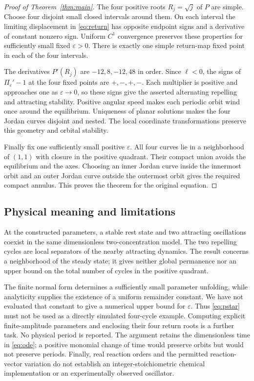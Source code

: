 \documentclass[11pt,a4paper]{article}
\theoremstyle{remark}
\newcommand{\eps}{\varepsilon}
\numberwithin{equation}{section}
\begin{document}
\begin{proof}[Proof of Theorem~\ref{thm:main}]
The four positive roots $R_j=\sqrt j$ of $P$ are simple. Choose
four disjoint small closed intervals around them. On each interval
the limiting displacement in \eqref{eq:return} has opposite endpoint
signs and a derivative of constant nonzero sign. Uniform $C^1$
convergence preserves these properties for sufficiently small fixed
$\eps>0$. There is exactly one simple return-map fixed point in
each of the four intervals.

The derivatives $P'(R_j)$ are $-12,8,-12,48$ in order. Since
$\ell<0$, the signs of $\Pi_\eps'-1$ at the four fixed points are
$+,-,+,-$. Each multiplier is positive and approaches one as
$\eps\to0$, so these signs give the asserted alternating
repelling and attracting stability. Positive angular speed makes
each periodic orbit wind once around the equilibrium. Uniqueness
of planar solutions makes the four Jordan curves disjoint and nested.
The local coordinate transformations preserve this geometry and
orbital stability.

Finally fix one sufficiently small positive $\eps$. All four curves
lie in a neighborhood of $(1,1)$ with closure in the positive
quadrant. Their compact union avoids the equilibrium and the axes.
Choosing an inner Jordan curve inside the innermost orbit and an
outer Jordan curve outside the outermost orbit gives the required
compact annulus. This proves the theorem for the original equation.
\end{proof}

\subsection{Physical meaning and limitations}
At the constructed parameters, a stable rest state and two attracting
oscillations coexist in the same dimensionless two-concentration
model. The two repelling cycles are local separators of the nearby
attracting dynamics. The result concerns a neighborhood of the steady
state; it gives neither global permanence nor an upper bound on the
total number of cycles in the positive quadrant.

The finite normal form determines a sufficiently small parameter
unfolding, while analyticity supplies the existence of a uniform
remainder constant. We have not evaluated that constant to give a
numerical upper bound for $\eps$. Thus \eqref{eq:pstar} must not be
used as a directly simulated four-cycle example. Computing explicit
finite-amplitude parameters and enclosing their four return roots is
a further task. No physical period is reported. The argument retains
the dimensionless time in \eqref{eq:ode}; a positive monomial change
of time would preserve orbits but would not preserve periods.
Finally, real reaction orders and the permitted reaction-vector
variation do not establish an integer-stoichiometric chemical
implementation or an experimentally observed oscillator.
\end{document}

